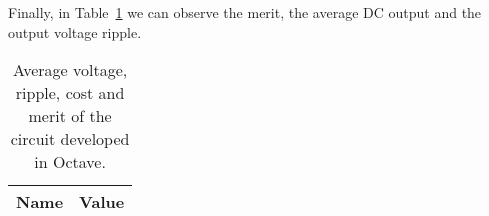 Finally, in Table~\ref{tab:merit} we can observe the merit, the average DC output and the output voltage ripple.

\begin{table}[H]
  \centering
  \begin{tabular}{|l|r|}
    \hline    
    {\bf Name} & {\bf Value} \\ \hline
	
  \end{tabular}
  \caption{Average voltage, ripple, cost and merit of the circuit developed in Octave.}
  \label{tab:merit}
\end{table}
